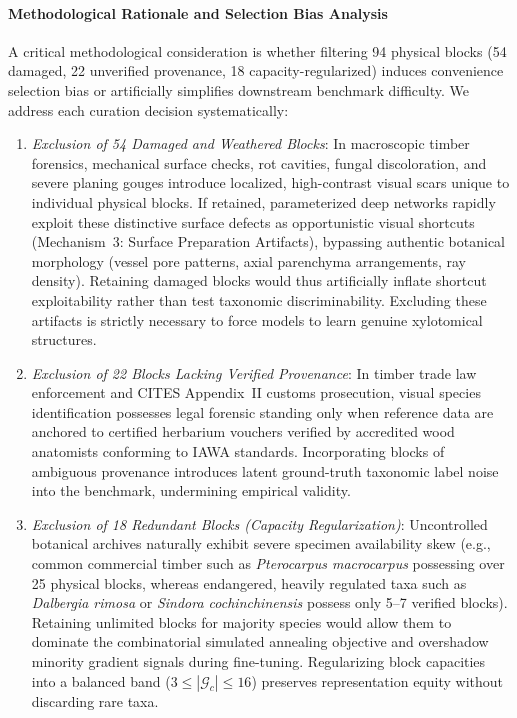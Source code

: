 \documentclass[a4paper,fleqn]{cas-sc}
\begin{document}
\paragraph{Methodological Rationale and Selection Bias Analysis}
A critical methodological consideration is whether filtering 94 physical blocks (54 damaged, 22 unverified provenance, 18 capacity-regularized) induces convenience selection bias or artificially simplifies downstream benchmark difficulty. We address each curation decision systematically:
\begin{enumerate}
\item \emph{Exclusion of 54 Damaged and Weathered Blocks}: In macroscopic timber forensics, mechanical surface checks, rot cavities, fungal discoloration, and severe planing gouges introduce localized, high-contrast visual scars unique to individual physical blocks. If retained, parameterized deep networks rapidly exploit these distinctive surface defects as opportunistic visual shortcuts (Mechanism~3: Surface Preparation Artifacts), bypassing authentic botanical morphology (vessel pore patterns, axial parenchyma arrangements, ray density). Retaining damaged blocks would thus artificially inflate shortcut exploitability rather than test taxonomic discriminability. Excluding these artifacts is strictly necessary to force models to learn genuine xylotomical structures.
\item \emph{Exclusion of 22 Blocks Lacking Verified Provenance}: In timber trade law enforcement and CITES Appendix~II customs prosecution, visual species identification possesses legal forensic standing only when reference data are anchored to certified herbarium vouchers verified by accredited wood anatomists conforming to IAWA standards. Incorporating blocks of ambiguous provenance introduces latent ground-truth taxonomic label noise into the benchmark, undermining empirical validity.
\item \emph{Exclusion of 18 Redundant Blocks (Capacity Regularization)}: Uncontrolled botanical archives naturally exhibit severe specimen availability skew (e.g., common commercial timber such as \textit{Pterocarpus macrocarpus} possessing over 25 physical blocks, whereas endangered, heavily regulated taxa such as \textit{Dalbergia rimosa} or \textit{Sindora cochinchinensis} possess only 5--7 verified blocks). Retaining unlimited blocks for majority species would allow them to dominate the combinatorial simulated annealing objective and overshadow minority gradient signals during fine-tuning. Regularizing block capacities into a balanced band ($3 \le |\mathcal{G}_c| \le 16$) preserves representation equity without discarding rare taxa.

\end{enumerate}
\end{document}
